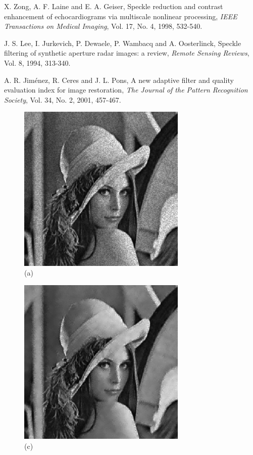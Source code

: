 \documentclass[twocolumn]{article}
\begin{document}
\begin{thebibliography}{00}
	X. Zong, A. F. Laine and E. A. Geiser, Speckle reduction and contrast enhancement
	of echocardiograms via multiscale nonlinear processing, \emph{IEEE Transactions on Medical Imaging},
	Vol. 17, No. 4, 1998, 532-540.
	
	J. S. Lee, I. Jurkevich, P. Dewaele, P. Wambacq and A. Oosterlinck,
	Speckle filtering of synthetic aperture radar
	images: a review, \emph{Remote Sensing Reviews}, Vol. 8, 1994, 313-340.

	A. R. Jim\'enez, R. Ceres and J. L. Pons, A new adaptive filter and quality
	evaluation index for image restoration, \emph{The Journal of the Pattern Recognition Society},
	Vol. 34, No. 2, 2001, 457-467.
\end{thebibliography}

\newpage
\clearpage
\onecolumn
\begin{figure}[h]
	\begin{minipage}[h]{8.3cm} {\begin{center} \includegraphics[height=8.05cm,width=8.05cm]{../../pics/lena_noisy.ps} \\(a) \end{center}} \end{minipage}
	\hspace{1.2cm}
	\begin{minipage}[h]{8.3cm} {\begin{center} \includegraphics[height=8.05cm,width=8.05cm]{../../pics/lena_lee.ps} \\(c) \end{center}} \end{minipage}
\end{figure}
\end{document}
